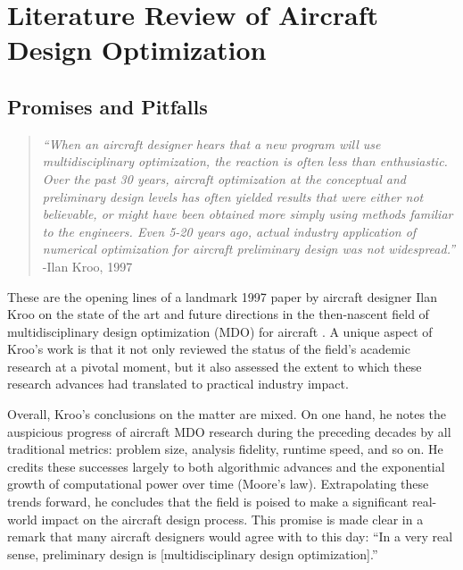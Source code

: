 \documentclass[12pt,vi,twoside]{article}
\begin{document}
    \section{Literature Review of Aircraft Design Optimization}

    \subsection{Promises and Pitfalls}

    \begin{quote}
        \textit{``When an aircraft designer hears that a new program will use multidisciplinary optimization, the reaction is often less than enthusiastic. Over the past 30 years, aircraft optimization at the conceptual and preliminary design levels has often yielded results that were either not believable, or might have been obtained more simply using methods familiar to the engineers. Even 5-20 years ago, actual industry application of numerical optimization for aircraft preliminary design was not widespread.''}
        \flushright-Ilan Kroo, 1997 \cite{kroo_multidisciplinary_1997}
    \end{quote}

    These are the opening lines of a landmark 1997 paper by aircraft designer Ilan Kroo on the state of the art and future directions in the then-nascent field of multidisciplinary design optimization (MDO) for aircraft \cite{kroo_multidisciplinary_1997}. A unique aspect of Kroo's work is that it not only reviewed the status of the field's academic research at a pivotal moment, but it also assessed the extent to which these research advances had translated to practical industry impact.

    Overall, Kroo's conclusions on the matter are mixed. On one hand, he notes the auspicious progress of aircraft MDO research during the preceding decades by all traditional metrics: problem size, analysis fidelity, runtime speed, and so on. He credits these successes largely to both algorithmic advances and the exponential growth of computational power over time (Moore's law). Extrapolating these trends forward, he concludes that the field is poised to make a significant real-world impact on the aircraft design process. This promise is made clear in a remark that many aircraft designers would agree with to this day: ``In a very real sense, preliminary design is [multidisciplinary design optimization].''
\end{document}
